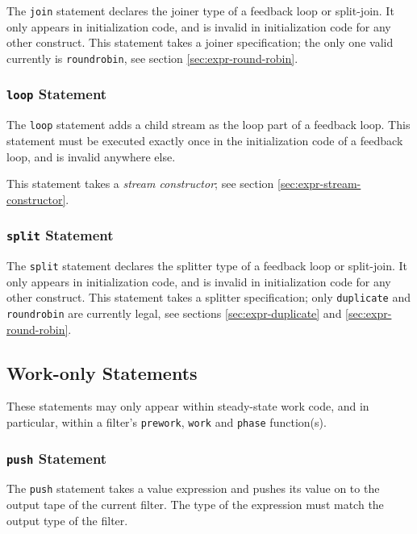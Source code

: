 \documentclass[11pt]{article}
\begin{document}
The \lstinline|join| statement declares the joiner type of a feedback
loop or split-join.  It only appears in initialization code, and is
invalid in initialization code for any other construct.  This
statement takes a joiner specification; the only one valid currently
is \lstinline|roundrobin|, see section \ref{sec:expr-round-robin}.

\subsubsection{\lstinline|loop| Statement}

The \lstinline|loop| statement adds a child stream as the loop part of
a feedback loop.  This statement must be executed exactly once in the
initialization code of a feedback loop, and is invalid anywhere else.

This statement takes a \emph{stream constructor}; see section
\ref{sec:expr-stream-constructor}.

\subsubsection{\lstinline|split| Statement}

The \lstinline|split| statement declares the splitter type of a feedback
loop or split-join.  It only appears in initialization code, and is
invalid in initialization code for any other construct.  This
statement takes a splitter specification; only \lstinline|duplicate| and
\lstinline|roundrobin| are currently legal, see sections
\ref{sec:expr-duplicate} and \ref{sec:expr-round-robin}.


\subsection{Work-only Statements}

These statements may only appear within steady-state work code, and in
particular, within a filter's \lstinline|prework|, \lstinline|work|
and \lstinline|phase| function(s).

\subsubsection{\lstinline|push| Statement}

The \lstinline|push| statement takes a value expression and pushes its
value on to the output tape of the current filter.  The type of the
expression must match the output type of the filter.
\end{document}
